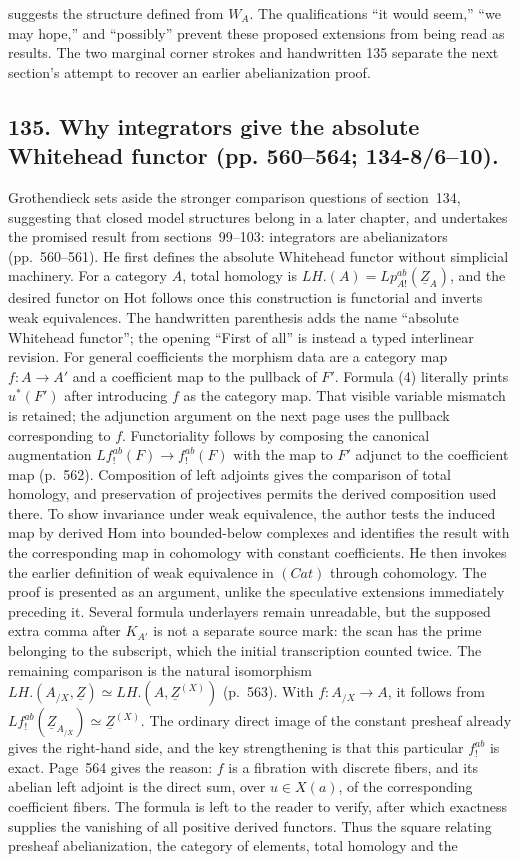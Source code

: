 \documentclass[10pt,oneside]{book}
\begin{document}
suggests the structure defined from $W_A$. The qualifications ``it would seem,'' ``we may hope,'' and ``possibly'' prevent these proposed extensions from being read as results. The two marginal corner strokes and handwritten 135 separate the next section's attempt to recover an earlier abelianization proof.

\subsection*{135. Why integrators give the absolute Whitehead functor (pp. 560--564; 134-8/6--10).}
Grothendieck sets aside the stronger comparison questions of section~134, suggesting that closed model structures belong in a later chapter, and undertakes the promised result from sections~99--103: integrators are abelianizators (pp.~560--561). He first defines the absolute Whitehead functor without simplicial machinery. For a category $A$, total homology is $LH.(A)=Lp^{ab}_{A!}(\underline Z_A)$, and the desired functor on $\mathrm{Hot}$ follows once this construction is functorial and inverts weak equivalences. The handwritten parenthesis adds the name ``absolute Whitehead functor''; the opening ``First of all'' is instead a typed interlinear revision. For general coefficients the morphism data are a category map $f:A\to A'$ and a coefficient map to the pullback of $F'$. Formula (4) literally prints $u^*(F')$ after introducing $f$ as the category map. That visible variable mismatch is retained; the adjunction argument on the next page uses the pullback corresponding to $f$. Functoriality follows by composing the canonical augmentation $Lf^{ab}_{!}(F)\to f^{ab}_{!}(F)$ with the map to $F'$ adjunct to the coefficient map (p.~562). Composition of left adjoints gives the comparison of total homology, and preservation of projectives permits the derived composition used there. To show invariance under weak equivalence, the author tests the induced map by derived Hom into bounded-below complexes and identifies the result with the corresponding map in cohomology with constant coefficients. He then invokes the earlier definition of weak equivalence in $(Cat)$ through cohomology. The proof is presented as an argument, unlike the speculative extensions immediately preceding it. Several formula underlayers remain unreadable, but the supposed extra comma after $K_{A'}$ is not a separate source mark: the scan has the prime belonging to the subscript, which the initial transcription counted twice. The remaining comparison is the natural isomorphism $LH.(A_{/X},\underline Z)\simeq LH.(A,\underline Z^{(X)})$ (p.~563). With $f:A_{/X}\to A$, it follows from $Lf^{ab}_{!}(\underline Z_{A_{/X}})\simeq\underline Z^{(X)}$. The ordinary direct image of the constant presheaf already gives the right-hand side, and the key strengthening is that this particular $f^{ab}_{!}$ is exact. Page~564 gives the reason: $f$ is a fibration with discrete fibers, and its abelian left adjoint is the direct sum, over $u\in X(a)$, of the corresponding coefficient fibers. The formula is left to the reader to verify, after which exactness supplies the vanishing of all positive derived functors. Thus the square relating presheaf abelianization, the category of elements, total homology and the 
\end{document}
